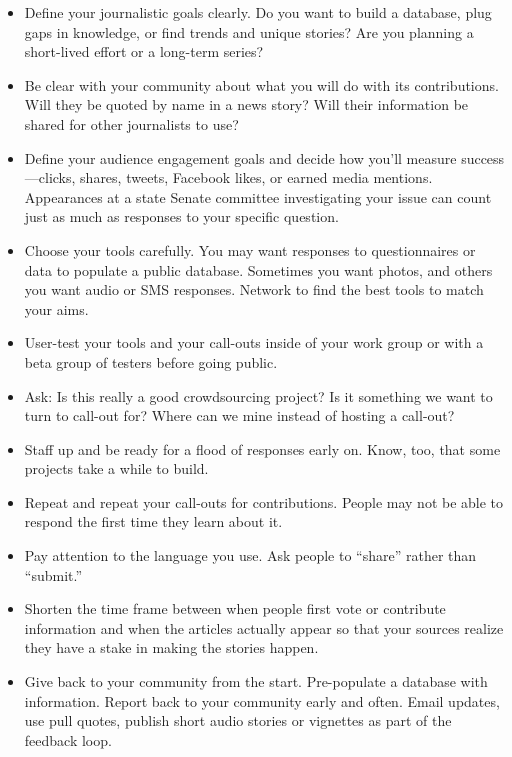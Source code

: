 \begin{itemize}
\begin{itemize}
\item Define your journalistic goals clearly. Do you want to build a database, plug gaps in knowledge, or find trends and unique stories? Are you planning a short-lived effort or a long-term series?

\item Be clear with your community about what you will do with its contributions. Will they be quoted by name in a news story? Will their information be shared for other journalists to use?

\item Define your audience engagement goals and decide how you’ll measure success---clicks, shares, tweets, Facebook likes, or earned media mentions. Appearances at a state Senate committee investigating your issue can count just as much as responses to your specific question. 

\item Choose your tools carefully. You may want responses to questionnaires or data to populate a public database. Sometimes you want photos, and others you want audio or SMS responses. Network to find the best tools to match your aims.

\item User-test your tools and your call-outs inside of your work group or with a beta group of testers before going public.

\item Ask: Is this really a good crowdsourcing project? Is it something we want to turn to call-out for? Where can we mine instead of hosting a call-out?

\item Staff up and be ready for a flood of responses early on. Know, too, that some projects take a while to build. 

\item Repeat and repeat your call-outs for contributions. People may not be able to respond the first time they learn about it.

\item Pay attention to the language you use. Ask people to ``share'' rather than ``submit.''

\item Shorten the time frame between when people first vote or contribute information and when the articles actually appear so that your sources realize they have a stake in making the stories happen.  

\item Give back to your community from the start. Pre-populate a database with information. Report back to your community early and often. Email updates, use pull quotes, publish short audio stories or vignettes as part of the feedback loop. 


\end{itemize}
\end{itemize}
